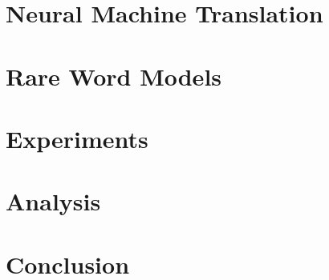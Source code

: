  

\section{Neural Machine Translation}
\label{sec:nmt}


\section{Rare Word Models}
\label{sec:rare}


\section{Experiments}
\label{sec:exp}


\section{Analysis}
\label{sec:analysis}


\section{Conclusion}
\label{sec:conclude}



